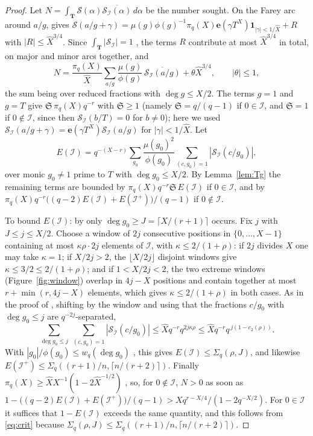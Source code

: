 \documentclass[11pt,a4paper]{amsart}
\theoremstyle{remark}
\newcommand{\cS}{\mathcal{S}}
\numberwithin{equation}{section}
\begin{document}
\begin{proof}
Let $N=\int_{\mathbf T}\cS(\alpha)\overline{\cS_{\mathcal I}(\alpha)}\,d\alpha$ be the number sought. On the Farey arc
around $a/g$, \cite[Lemma~2.8]{Ha} gives $\cS(a/g+\gamma)=\mu(g)\phi(g)^{-1}\pi_q(X)\mathbf e(\gamma T^X)
\mathbf 1_{|\gamma|<1/\hat X}+R$ with $|R|\le\hat X^{3/4}$. Since $\int_{\mathbf T}|\cS_{\mathcal I}|=1$
\cite[Lemma~2.4]{Ha}, the terms $R$ contribute at most $\hat X^{3/4}$ in total, on major and minor arcs together, and
\[
N=\frac{\pi_q(X)}{\hat X}\sum_{a/g}\frac{\mu(g)}{\phi(g)}\,\overline{\cS_{\mathcal I}(a/g)}+\theta\hat X^{3/4},\qquad|\theta|\le1,
\]
the sum being over reduced fractions with $\deg g\le X/2$. The terms $g=1$ and $g=T$ give
$\mathfrak S\,\pi_q(X)q^{-r}$ with $\mathfrak S\ge1$ (namely $\mathfrak S=q/(q-1)$ if $0\in\mathcal I$, and
$\mathfrak S=1$ if $0\notin\mathcal I$, since then $\cS_{\mathcal I}(b/T)=0$ for $b\ne0$); here we used
$\cS_{\mathcal I}(a/g+\gamma)=\mathbf e(\gamma T^X)\cS_{\mathcal I}(a/g)$ for $|\gamma|<1/\hat X$. Let
\[
E(\mathcal I)=q^{-(X-r)}\sum_{g_0}\frac{\mu(g_0)^2}{\phi(g_0)}\sum_{(c,g_0)=1}|\cS_{\mathcal I}(c/g_0)|,
\]
over monic $g_0\ne1$ prime to $T$ with $\deg g_0\le X/2$. By Lemma~\ref{lem:Tg} the remaining terms are bounded by
$\pi_q(X)q^{-r}\mathfrak S\,E(\mathcal I)$ if $0\in\mathcal I$, and by
$\pi_q(X)q^{-r}\bigl((q-2)E(\mathcal I)+E(\mathcal I^+)\bigr)/(q-1)$ if $0\notin\mathcal I$.

To bound $E(\mathcal I)$: by \cite[Lemma~2.7]{Ha} only $\deg g_0\ge J=\lceil X/(r+1)\rceil$ occurs. Fix $j$ with
$J\le j\le X/2$. Choose a window of $2j$ consecutive positions in $\{0,\dots,X-1\}$ containing at most
$\kappa\rho\cdot2j$ elements of $\mathcal I$, with $\kappa\le2/(1+\rho)$: if $2j$ divides $X$ one may take
$\kappa=1$; if $X/2j>2$, the $\lfloor X/2j\rfloor$ disjoint windows give $\kappa\le3/2\le2/(1+\rho)$; and if
$1<X/2j<2$, the two extreme windows (Figure~\ref{fig:window}) overlap in $4j-X$ positions and contain together at most
$r+\min(r,4j-X)$ elements, which gives $\kappa\le2/(1+\rho)$ in both cases. As in the proof of
\cite[Lemma~2.6]{Ha}, shifting by the window and using that the fractions $c/g_0$ with $\deg g_0\le j$ are
$q^{-2j}$-separated,
\[
\sum_{\deg g_0\le j}\ \sum_{(c,g_0)=1}|\cS_{\mathcal I}(c/g_0)|\le\hat Xq^{-r}q^{2j\kappa\rho}
\le\hat Xq^{-r}q^{\,j(1-c_2(\rho))}.
\]
With $|g_0|/\phi(g_0)\le w_q(\deg g_0)$ \cite[Lemma~2.3]{Ha}, this gives
$E(\mathcal I)\le\Sigma_q(\rho,J)$, and likewise $E(\mathcal I^+)\le\Sigma_q((r+1)/n,\lceil n/(r+2)\rceil)$. Finally
$\pi_q(X)\ge\hat XX^{-1}(1-2\hat X^{-1/2})$ \cite[Lemma~2.2]{Ha}, so, for $0\notin\mathcal I$, $N>0$ as soon as
$1-\bigl((q-2)E(\mathcal I)+E(\mathcal I^+)\bigr)/(q-1)>Xq^{r-X/4}/(1-2q^{-X/2})$. For $0\in\mathcal I$ it suffices
that $1-E(\mathcal I)$ exceeds the same quantity, and this follows from \eqref{eq:crit} because
$\Sigma_q(\rho,J)\le\Sigma_q((r+1)/n,\lceil n/(r+2)\rceil)$.
\end{proof}
\end{document}
